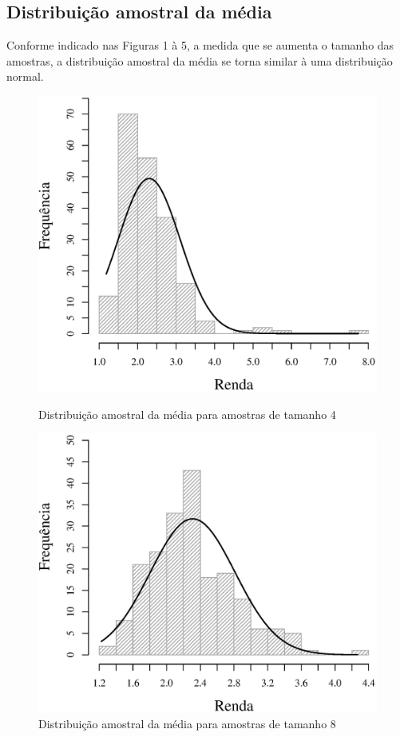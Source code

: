 \subsection{Distribuição amostral da média}
Conforme indicado nas Figuras 1 à 5, a medida que se aumenta o tamanho das amostras,
a distribuição amostral da média se torna similar à uma distribuição normal.

\begin{figure}[h]
\begin{minipage}{0.50\textwidth}
	\includegraphics[width=\linewidth]{plots/histogram_renda_n4.eps}
	\caption{Distribuição amostral da média para amostras de tamanho 4}
	\label{fig:m4}
\end{minipage}
\begin{minipage}{0.50\textwidth}
	\includegraphics[width=\linewidth]{plots/histogram_renda_n8.eps}
	\caption{Distribuição amostral da média para amostras de tamanho 8}
	\label{fig:m8}
\end{minipage}
\end{figure}

